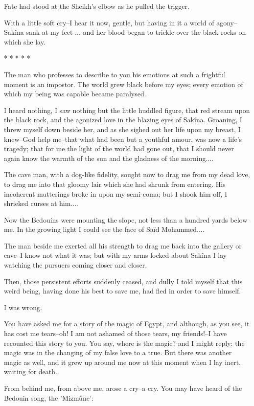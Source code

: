 Fate had stood at the Sheikh's elbow as he pulled the trigger.

With a little soft cry--I hear it now, gentle, but having in it a
world of agony--Sakîna sank at my feet ... and her blood began to
trickle over the black rocks on which she lay.

       *       *       *       *       *

The man who professes to describe to you his emotions at such a
frightful moment is an impostor. The world grew black before my eyes;
every emotion of which my being was capable became paralysed.

I heard nothing, I saw nothing but the little huddled figure, that red
stream upon the black rock, and the agonized love in the blazing eyes
of Sakîna. Groaning, I threw myself down beside her, and as she sighed
out her life upon my breast, I knew--God help me--that what had been
but a youthful amour, was now a life's tragedy; that for me the light
of the world had gone out, that I should never again know the warmth
of the sun and the gladness of the morning....

The cave man, with a dog-like fidelity, sought now to drag me from my
dead love, to drag me into that gloomy lair which she had shrunk from
entering. His incoherent mutterings broke in upon my semi-coma; but I
shook him off, I shrieked curses at him....

Now the Bedouins were mounting the slope, not less than a hundred
yards below me. In the growing light I could see the face of Saïd
Mohammed....

The man beside me exerted all his strength to drag me back into the
gallery or cave--I know not what it was; but with my arms locked about
Sakîna I lay watching the pursuers coming closer and closer.

Then, those persistent efforts suddenly ceased, and dully I told
myself that this weird being, having done his best to save me, had
fled in order to save himself.

I was wrong.

You have asked me for a story of the magic of Egypt, and although,
as you see, it has cost me tears--oh! I am not ashamed of those tears,
my friends!--I have recounted this story to you. You say, where is the
magic? and I might reply: the magic was in the changing of my false
love to a true. But there was another magic as well, and it grew up
around me now at this moment when I lay inert, waiting for death.

From behind me, from above me, arose a cry--a cry. You may have heard
of the Bedouin song, the 'Mizmûne':

